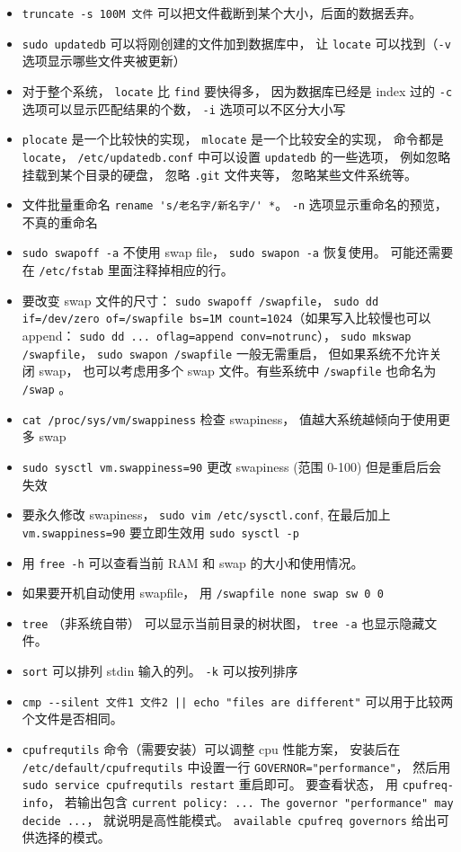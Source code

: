 \begin{itemize}
\item \verb`truncate -s 100M 文件` 可以把文件截断到某个大小，后面的数据丢弃。
\item \verb`sudo updatedb` 可以将刚创建的文件加到数据库中， 让 \verb`locate` 可以找到（\verb`-v` 选项显示哪些文件夹被更新）
\item 对于整个系统， \verb`locate` 比 \verb`find` 要快得多， 因为数据库已经是 index 过的 \verb`-c` 选项可以显示匹配结果的个数， \verb`-i` 选项可以不区分大小写
\item \verb`plocate` 是一个比较快的实现， \verb`mlocate` 是一个比较安全的实现， 命令都是 \verb`locate`， \verb`/etc/updatedb.conf` 中可以设置 \verb`updatedb` 的一些选项， 例如忽略挂载到某个目录的硬盘， 忽略 \verb`.git` 文件夹等， 忽略某些文件系统等。
\item 文件批量重命名 \verb`rename 's/老名字/新名字/' *`。 \verb`-n` 选项显示重命名的预览， 不真的重命名
\item \verb`sudo swapoff -a` 不使用 swap file， \verb`sudo swapon -a` 恢复使用。 可能还需要在 \verb`/etc/fstab` 里面注释掉相应的行。
\item 要改变 swap 文件的尺寸： \verb`sudo swapoff /swapfile`， \verb`sudo dd if=/dev/zero of=/swapfile bs=1M count=1024`（如果写入比较慢也可以 append： \verb`sudo dd ... oflag=append conv=notrunc`）， \verb`sudo mkswap /swapfile`， \verb`sudo swapon /swapfile` 一般无需重启， 但如果系统不允许关闭 swap， 也可以考虑用多个 swap 文件。有些系统中 \verb`/swapfile` 也命名为 \verb`/swap` 。
\item \verb`cat /proc/sys/vm/swappiness` 检查 swapiness， 值越大系统越倾向于使用更多 swap
\item \verb`sudo sysctl vm.swappiness=90` 更改 swapiness (范围 0-100) 但是重启后会失效
\item 要永久修改 swapiness， \verb`sudo vim /etc/sysctl.conf`, 在最后加上 \verb`vm.swappiness=90` 要立即生效用 \verb`sudo sysctl -p`
\item 用 \verb`free -h` 可以查看当前 RAM 和 swap 的大小和使用情况。
\item 如果要开机自动使用 swapfile， 用 \verb`/swapfile none swap sw 0 0`
\item \verb`tree` （非系统自带） 可以显示当前目录的树状图， \verb`tree -a` 也显示隐藏文件。
\item \verb`sort` 可以排列 stdin 输入的列。 \verb`-k` 可以按列排序
\item \verb`cmp --silent 文件1 文件2 || echo "files are different"` 可以用于比较两个文件是否相同。
\item \verb`cpufrequtils` 命令（需要安装）可以调整 cpu 性能方案， 安装后在 \verb`/etc/default/cpufrequtils` 中设置一行 \verb`GOVERNOR="performance"`， 然后用 \verb`sudo service cpufrequtils restart` 重启即可。 要查看状态， 用 \verb`cpufreq-info`， 若输出包含 \verb`current policy: ... The governor "performance" may decide ...`， 就说明是高性能模式。 \verb`available cpufreq governors` 给出可供选择的模式。
\end{itemize}

